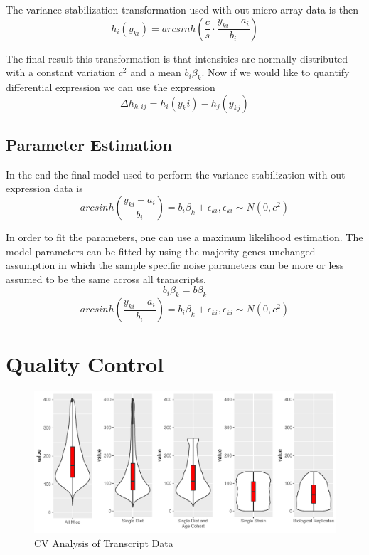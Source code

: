 \documentclass[a4paper,11pt,twoside]{book}
\begin{document}
	The variance stabilization transformation used with out micro-array data is then
	$$h_i(y_{ki}) = arcsinh(\dfrac{c}{s}{\cdot}\dfrac{y_{ki} - a_i}{b_i}) $$
	
	\begin{minipage}{\linewidth}%
		The final result this transformation is that intensities are normally distributed with a constant variation $c^2$ and a mean $b_i\beta_k$. Now if we would like to quantify differential expression we can use the expression
		$$ {\Delta}h_{k,ij} = h_i(y_ki) - h_j(y_{kj}) $$
	\end{minipage}
	
	
	\subsection{Parameter Estimation}
	
	In the end the final model used to perform the variance stabilization with out expression data is
	$$ arcsinh(\dfrac{y_{ki}-a_i}{b_i}) = b_i\beta_k + \epsilon_{ki}, \epsilon_{ki} \sim N(0,c^2)$$
	
	In order to fit the parameters, one can use a maximum likelihood estimation. The model parameters can be fitted by using the majority genes unchanged assumption in which the sample specific noise parameters can be more or less assumed to be the same across all transcripts. 
	$$ b_i\beta_k = b\beta_k $$
	$$ arcsinh(\dfrac{y_{ki}-a_i}{b_i}) = b_i\beta_k + \epsilon_{ki}, \epsilon_{ki} \sim N(0,c^2)$$
	
	
	\section{Quality Control}
	
	\begin{figure}[htb!]
		\centering
		\includegraphics[width=1.2\linewidth]{3.Trancriptomics/transcript_CV_figure}
		\caption{CV Analysis of Transcript Data}
		\label{fig:transcriptcvfigure}
	\end{figure}
	
\end{document}
